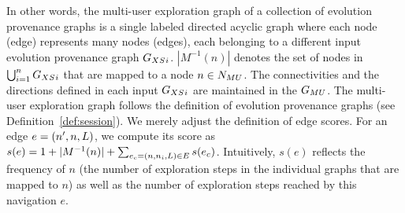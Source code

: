 In other words, the multi-user exploration graph of a collection of evolution provenance graphs is a single labeled directed acyclic graph 
where each node (edge) represents many nodes (edges), each belonging to a different input evolution provenance graph $G_{XS}{}_i$. $|M^{-1}(n)|$ denotes the set of nodes in $\bigcup_{i=1}^n G_{XS}{}_i$ that are mapped to a node $n \in N_{MU}{}$.
The connectivities and the directions defined in each input $G_{XS}{}_i$ are maintained in the $G_{MU}{}$.
 The multi-user exploration graph follows the definition of evolution provenance graphs (see Definition~\ref{def:session}). We merely adjust the definition of edge scores. 
For an edge $e = (n', n, L{})$, we compute its score as $ s(e) = 1+|M^{-1}(n)|+\sum_{e_c = (n, n_i, L) \in E} s(e_c)$. Intuitively, $s(e)$ reflects the frequency of $n$ (the number of exploration steps in the individual graphs that are mapped to $n$) as well as the number of exploration steps reached by this navigation $e$.




